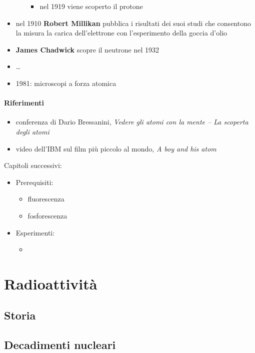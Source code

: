 \begin{itemize}
\begin{itemize}
\begin{itemize}
                    \item nel 1919 viene scoperto il protone
                \end{itemize}
        \end{itemize}
    \item nel 1910 \textbf{Robert Millikan} pubblica i risultati dei suoi studi che consentono la misura la carica dell'elettrone con l'esperimento della goccia d'olio
    \item \textbf{James Chadwick} scopre il neutrone nel 1932
    \item \dots
    \item 1981: microscopi a forza atomica
\end{itemize}

\subsubsection*{Riferimenti}
\begin{itemize}
    \item conferenza di Dario Bressanini, \textit{Vedere gli atomi con la mente -- La scoperta degli atomi}
    \item video dell'IBM sul film più piccolo al mondo, \textit{A boy and his atom}
\end{itemize}

\vspace{20pt}
Capitoli successivi:
\begin{itemize}
    \item Prerequisiti:
        \begin{itemize}
            \item fluorescenza
            \item fosforescenza
        \end{itemize}
    \item Esperimenti:
        \begin{itemize}
            \item
        \end{itemize}
\end{itemize}

\chapter{Radioattività}
\section{Storia}

\section{Decadimenti nucleari}

